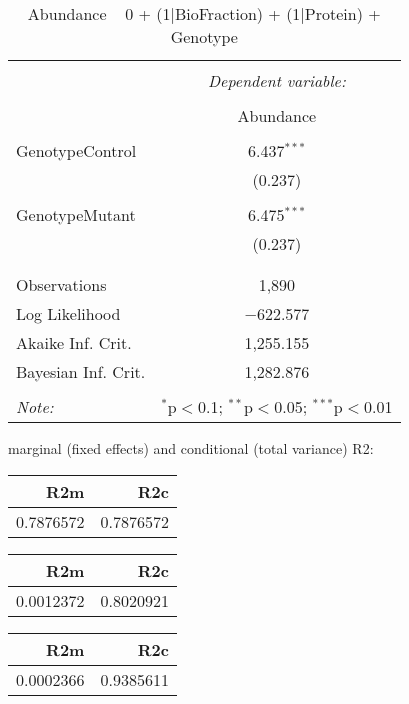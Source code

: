 \documentclass[11pt]{report}
\begin{document}
\begin{table}[!htbp] \centering 
  \caption{Abundance ~ 0 + (1|BioFraction) + (1|Protein) + Genotype} 
  \label{} 
\begin{tabular}{@{\extracolsep{5pt}}lc} 
\\[-1.8ex]\hline 
\hline \\[-1.8ex] 
 & \multicolumn{1}{c}{\textit{Dependent variable:}} \\ 
\cline{2-2} 
\\[-1.8ex] & Abundance \\ 
\hline \\[-1.8ex] 
 GenotypeControl & 6.437$^{***}$ \\ 
  & (0.237) \\ 
  & \\ 
 GenotypeMutant & 6.475$^{***}$ \\ 
  & (0.237) \\ 
  & \\ 
\hline \\[-1.8ex] 
Observations & 1,890 \\ 
Log Likelihood & $-$622.577 \\ 
Akaike Inf. Crit. & 1,255.155 \\ 
Bayesian Inf. Crit. & 1,282.876 \\ 
\hline 
\hline \\[-1.8ex] 
\textit{Note:}  & \multicolumn{1}{r}{$^{*}$p$<$0.1; $^{**}$p$<$0.05; $^{***}$p$<$0.01} \\ 
\end{tabular} 
\end{table} 
marginal (fixed effects) and conditional (total variance) R2:

\begin{tabular}{r|r}
\hline
R2m & R2c\\
\hline
0.7876572 & 0.7876572\\
\hline
\end{tabular}

\begin{tabular}{r|r}
\hline
R2m & R2c\\
\hline
0.0012372 & 0.8020921\\
\hline
\end{tabular}

\begin{tabular}{r|r}
\hline
R2m & R2c\\
\hline
0.0002366 & 0.9385611\\
\hline
\end{tabular}
\end{document}
